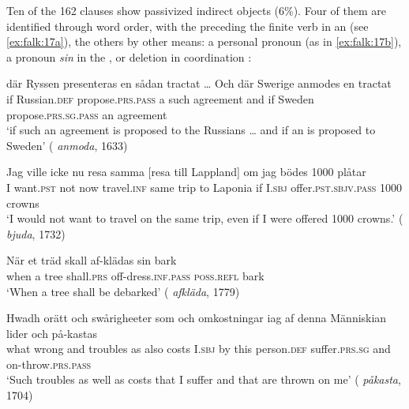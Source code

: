 \documentclass[output=paper]{langscibook}
\begin{document}
Ten of the 162 clauses show passivized indirect objects (6\%). Four of them are identified through word order, with the  preceding the finite verb in an  (see \ref{ex:falk:17a}), the others by other means: a personal pronoun (as in \ref{ex:falk:17b}), a   pronoun \textit{sin} in the  , or deletion in coordination :


\ea%
    \label{ex:falk:17}
\ea\label{ex:falk:17a}
\gll där  Ryssen      presenteras       en  sådan  tractat … Och    där    Swerige  anmodes            en  tractat\\
if    Russian\textsc{.def}  propose\textsc{.prs}.\textsc{pass}    a  such    agreement   {}  and    if         Sweden  propose\textsc{.prs}.\textsc{sg}.\textsc{pass}  an  agreement\\
\glt ‘if such an agreement is proposed to the Russians … and if an  is proposed to Sweden’ {( \textit{anmoda}, 1633)}

\ex\label{ex:falk:17b}
\gll Jag  ville      icke  nu    resa      samma [resa till Lappland] om  jag  bödes           1000  plåtar\\
I    want.\textsc{pst}  not  now  travel\textsc{.inf}  same     trip to Laponia  if  I.\textsc{sbj}   offer.\textsc{pst.sbjv}.\textsc{pass}  1000  crowns\\
\glt ‘I would not want to travel on the same trip, even if I were offered 1000 crowns.’ ( \textit{bjuda}, 1732)

\ex\label{ex:falk:17c}
\gll När  et  träd  skall        af-klädas          sin        bark\\
      when  a  tree  shall.\textsc{prs}  off-dress\textsc{.inf}.\textsc{pass}  \textsc{poss}.\textsc{refl}    bark\\
\glt ‘When a tree shall be debarked’ ( \textit{afkläda}, 1779)

\ex\label{ex:falk:17d}
\gll Hwadh  orätt    och  swårigheeter  som  och  omkostningar  iag    af  denna Människian    lider          och  på-kastas\\
what    wrong  and  troubles       as     also  costs          I.\textsc{sbj}  by  this            person.\textsc{def}    suffer.\textsc{prs.sg}    and  on-throw.\textsc{prs}.\textsc{pass}\\
\glt ‘Such troubles as well as costs that I suffer and that are thrown on   me’ {( \textit{påkasta}, 1704)}
\z
\z
\end{document}
